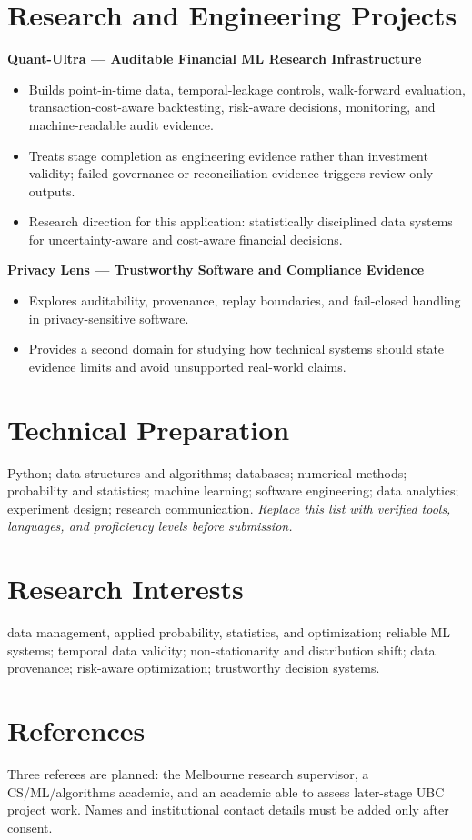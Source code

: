 \documentclass[11pt]{article}
\begin{document}
\section*{Research and Engineering Projects}
\textbf{Quant-Ultra --- Auditable Financial ML Research Infrastructure}
\begin{itemize}
\item Builds point-in-time data, temporal-leakage controls, walk-forward evaluation, transaction-cost-aware backtesting, risk-aware decisions, monitoring, and machine-readable audit evidence.
\item Treats stage completion as engineering evidence rather than investment validity; failed governance or reconciliation evidence triggers review-only outputs.
\item Research direction for this application: statistically disciplined data systems for uncertainty-aware and cost-aware financial decisions.
\end{itemize}

\textbf{Privacy Lens --- Trustworthy Software and Compliance Evidence}
\begin{itemize}
\item Explores auditability, provenance, replay boundaries, and fail-closed handling in privacy-sensitive software.
\item Provides a second domain for studying how technical systems should state evidence limits and avoid unsupported real-world claims.
\end{itemize}

\section*{Technical Preparation}
Python; data structures and algorithms; databases; numerical methods; probability and statistics; machine learning; software engineering; data analytics; experiment design; research communication. \textit{Replace this list with verified tools, languages, and proficiency levels before submission.}

\section*{Research Interests}
data management, applied probability, statistics, and optimization; reliable ML systems; temporal data validity; non-stationarity and distribution shift; data provenance; risk-aware optimization; trustworthy decision systems.

\section*{References}
Three referees are planned: the Melbourne research supervisor, a CS/ML/algorithms academic, and an academic able to assess later-stage UBC project work. Names and institutional contact details must be added only after consent.
\end{document}
